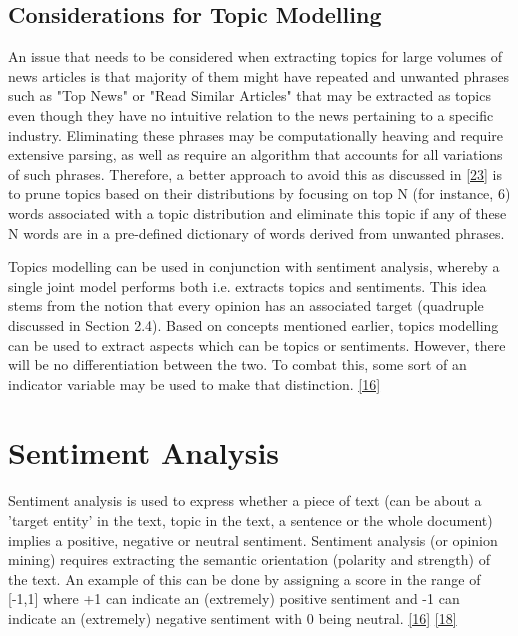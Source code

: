 \subsection{Considerations for Topic Modelling}

An issue that needs to be considered when extracting topics for large volumes of news articles is that majority of them might have repeated and unwanted phrases such as "Top News" or "Read Similar Articles" that may be extracted as topics even though they have no intuitive relation to the news pertaining to a specific industry. Eliminating these phrases may be computationally heaving and require extensive parsing, as well as require an algorithm that accounts for all variations of such phrases. Therefore, a better approach to avoid this as discussed in \hyperlink{23}{[23]} is to prune topics based on their distributions by focusing on top N (for instance, 6) words associated with a topic distribution and eliminate this topic if any of these N words are in a pre-defined dictionary of words derived from unwanted phrases.

Topics modelling can be used in conjunction with sentiment analysis, whereby a single joint model performs both i.e. extracts topics and sentiments. This idea stems from the notion that every opinion has an associated target (quadruple discussed in Section 2.4).  Based on concepts mentioned earlier, topics modelling can be used to extract aspects which can be topics or sentiments. However, there will be no differentiation between the two. To combat this, some sort of an indicator variable may be used to make that distinction. \hyperlink{16}{[16]}

\section{Sentiment Analysis}

Sentiment analysis is used to express whether a piece of text (can be about a 'target entity' in the text, topic in the text, a sentence or the whole document) implies a positive, negative or neutral sentiment. Sentiment analysis (or opinion mining) requires extracting the semantic orientation (polarity and strength) of the text. An example of this can be done by assigning a score in the range of [-1,1] where +1 can indicate an (extremely) positive sentiment and -1 can indicate an (extremely) negative sentiment with 0 being neutral. \hyperlink{16}{[16]} \hyperlink{18}{[18]}

